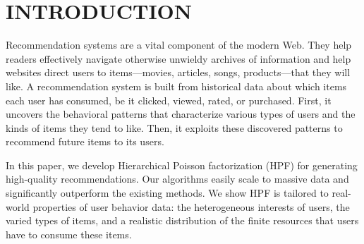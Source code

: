 \section{INTRODUCTION}
Recommendation systems are a vital component of the modern Web.  They
help readers effectively navigate otherwise unwieldy archives of
information and help websites direct users to items---movies,
articles, songs, products---that they will like.  A recommendation
system is built from historical data about which items each user has
consumed, be it clicked, viewed, rated, or purchased. First, it
uncovers the behavioral patterns that characterize various types of
users and the kinds of items they tend to like.  Then, it exploits
these discovered patterns to recommend future items to its users.

In this paper, we develop Hierarchical Poisson factorization (HPF) for
generating high-quality recommendations. Our algorithms easily scale
to massive data and significantly outperform the existing methods. We
show HPF is tailored to real-world properties of user behavior data:
the heterogeneous interests of users, the varied types of items, and a
realistic distribution of the finite resources that users have to
consume these items.


